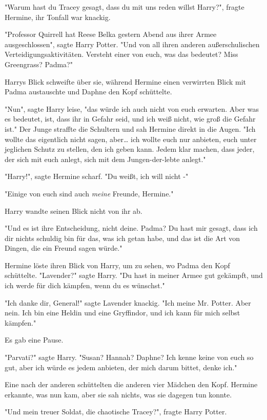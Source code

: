 {"Warum hast du Tracey gesagt, dass du mit uns reden willst Harry?", fragte Hermine, ihr Tonfall war knackig.

"Professor Quirrell hat Reese Belka gestern Abend aus ihrer Armee ausgeschlossen", sagte Harry Potter. "Und von all ihren anderen außerschulischen Verteidigungsaktivitäten. Versteht einer von euch, was das bedeutet? Miss Greengrass? Padma?"

Harrys Blick schweifte über sie, während Hermine einen verwirrten Blick mit Padma austauschte und Daphne den Kopf schüttelte.

"Nun", sagte Harry leise, "das würde ich auch nicht von euch erwarten. Aber was es bedeutet, ist, dass ihr in Gefahr seid, und ich weiß nicht, wie groß die Gefahr ist." Der Junge straffte die Schultern und sah Hermine direkt in die Augen. "Ich wollte das eigentlich nicht sagen, aber… ich wollte euch nur anbieten, euch unter jeglichen Schutz zu stellen, den ich geben kann. Jedem klar machen, dass jeder, der sich mit euch anlegt, sich mit dem Jungen-der-lebte anlegt."

"Harry!", sagte Hermine scharf. "Du weißt, ich will nicht -"

"Einige von euch sind auch \emph{meine} Freunde, Hermine."

Harry wandte seinen Blick nicht von ihr ab.

"Und es ist ihre Entscheidung, nicht deine. Padma? Du hast mir gesagt, dass ich dir nichts schuldig bin für das, was ich getan habe, und das ist die Art von Dingen, die ein Freund sagen würde."

Hermine löste ihren Blick von Harry, um zu sehen, wo Padma den Kopf schüttelte. "Lavender?" sagte Harry. "Du hast in meiner Armee gut gekämpft, und ich werde für dich kämpfen, wenn du es wünschst."

"Ich danke dir, General!" sagte Lavender knackig. "Ich meine Mr. Potter. Aber nein. Ich bin eine Heldin und eine Gryffindor, und ich kann für mich selbst kämpfen."

Es gab eine Pause.

"Parvati?" sagte Harry. "Susan? Hannah? Daphne? Ich kenne keine von euch so gut, aber ich würde es jedem anbieten, der mich darum bittet, denke ich."

Eine nach der anderen schüttelten die anderen vier Mädchen den Kopf. Hermine erkannte, was nun kam, aber sie sah nichts, was sie dagegen tun konnte.

"Und mein treuer Soldat, die chaotische Tracey?", fragte Harry Potter.

}
